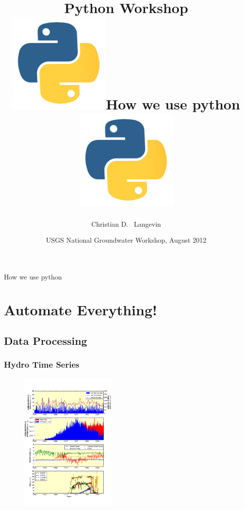 \documentclass[t]{beamer}
\title[]{Python Workshop\\
 \includegraphics[scale=0.055]{figures/python-app.png}\hspace{5 pt}How we use python\hspace{5 pt}\includegraphics[scale=0.055]{figures/python-app.png} }
\author[Langevin] %
{Christian D. ~Langevin}
\institute[USGS] %
{
  U.S. Geological Survey\\
  Reston, Virgina USA
  }
\date[UQ12] %
{USGS National Groundwater Workshop, August 2012}
\begin{document}
\begin{frame}
  \titlepage
\end{frame}

\begin{frame}{How we use python}
\tableofcontents
\end{frame}


\section{Automate Everything!}
\subsection{Data Processing}

\begin{frame}[fragile]
\frametitle{Hydro Time Series}
  \begin{figure}[ht]
  \centering
         \includegraphics[height=7cm]{figures/hydrotimeseries.png}
   \end{figure}
\end{frame}
\end{document}

